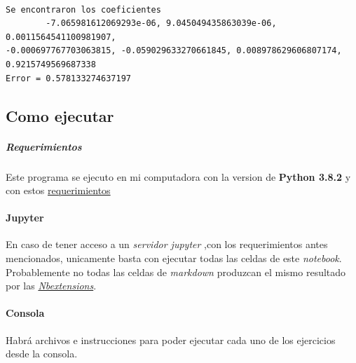 \documentclass[11pt]{article}
\begin{document}
    \begin{center}
    \end{center}
    { \hspace*{\fill} \\}
    
    \begin{Verbatim}[commandchars=\\\{\}]
Se encontraron los coeficientes
        -7.065981612069293e-06, 9.045049435863039e-06, 0.0011564541100981907,
-0.000697767703063815, -0.059029633270661845, 0.008978629606807174,
0.9215749569687338
Error = 0.578133274637197
    \end{Verbatim}










\newpage
    \hypertarget{como-ejecutar}{%
\subsection{Como ejecutar}\label{como-ejecutar}}

\hypertarget{requerimientos}{%
\subparagraph{Requerimientos}\label{requerimientos}}

Este programa se ejecuto en mi computadora con la version de
\textbf{Python 3.8.2} y con estos
\href{https://github.com/BenchHPZ/UG-Compu/blob/master/MN/requerimientos.txt}{requerimientos}

\hypertarget{jupyter}{%
\paragraph{Jupyter}\label{jupyter}}

En caso de tener acceso a un \emph{servidor jupyter} ,con los
requerimientos antes mencionados, unicamente basta con ejecutar todas
las celdas de este \emph{notebook}. Probablemente no todas las celdas de
\emph{markdown} produzcan el mismo resultado por las
\href{jupyter-contrib-nbextensions.readthedocs.io}{\emph{Nbextensions}}.

\hypertarget{consola}{%
\paragraph{Consola}\label{consola}}

Habrá archivos e instrucciones para poder ejecutar cada uno de los
ejercicios desde la consola.
\end{document}
